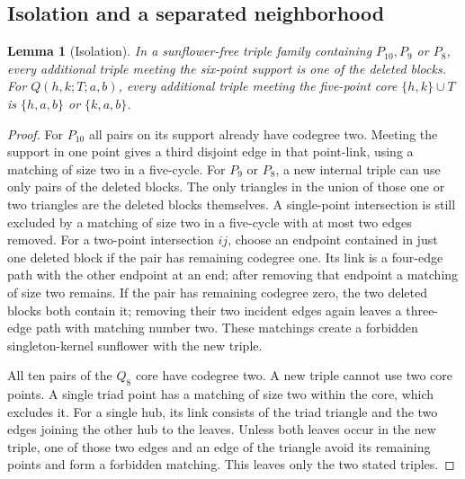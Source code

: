 \documentclass[11pt,a4paper]{article}
\numberwithin{equation}{section}
\newtheorem{lemma}[theorem]{Lemma}
\theoremstyle{remark}
\begin{document}
\subsection{Isolation and a separated neighborhood}
\begin{lemma}[Isolation]
\label{lem:isolation}
In a sunflower-free triple family containing $ P_{10},P_9$ or $ P_8$,
every additional triple meeting the six-point support is one of the
deleted blocks. For $ Q(h,k;T;a,b)$, every additional triple meeting
the five-point core $\{h,k\}\cup T $ is $\{h,a,b\}$ or $\{k,a,b\}$.
\end{lemma}
\begin{proof}
For $ P_{10}$ all pairs on its support already have codegree two.
Meeting the support in one point gives a third disjoint edge in
that point-link, using a matching of size two in a five-cycle.
For $ P_9$ or $ P_8$, a new internal triple can use only pairs of the
deleted blocks. The only triangles in the union of those one or
two triangles are the deleted blocks themselves. A single-point
intersection is still excluded by a matching of size two in a
five-cycle with at most two edges removed. For a two-point
intersection $ ij $, choose an endpoint contained in just one deleted
block if the pair has remaining codegree one. Its link is a
four-edge path with the other endpoint at an end; after removing
that endpoint a matching of size two remains. If the pair has
remaining codegree zero, the two deleted blocks both contain it;
removing their two incident edges again leaves a three-edge path
with matching number two. These matchings create a forbidden
singleton-kernel sunflower with the new triple.

All ten pairs of the $ Q_8$ core have codegree two. A new triple
cannot use two core points. A single triad point has a matching of
size two within the core, which excludes it. For a single hub,
its link consists of the triad triangle and the two edges joining
the other hub to the leaves. Unless both leaves occur in the new
triple, one of those two edges and an edge of the triangle avoid
its remaining points and form a forbidden matching. This leaves
only the two stated triples.
\end{proof}
\end{document}
